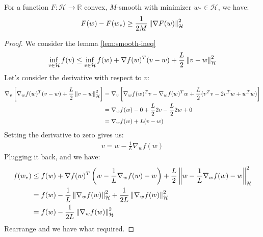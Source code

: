 \begin{lemma}
    For a function $F:\mathcal{H}\rightarrow \mathbb{R}$ convex, $M$-smooth with minimizer $w_*\in\mathcal{H}$, we have:
    \begin{equation*}
        F(w) - F(w_*) \ge \frac{1}{2M}\left\lVert\nabla F(w)\right\rVert^2_\mathcal{H}
    \end{equation*}
\end{lemma}
\begin{proof}
    We consider the lemma \ref{lem:smooth-ineq}
    \begin{equation*}
    \begin{aligned}
        \inf_{v\in\mathcal{H}} f(v) &\le \inf_{v\in\mathcal{H}} f(w) + \nabla f(w)^T(v-w) + \frac{L}{2}\left\lVert v-w\right\rVert^2_\mathcal{H}\\ 
    \end{aligned}
    \end{equation*}
    Let's consider the derivative with respect to $v$:
    \begin{equation*}
    \begin{aligned}
        \nabla_v \left[ \nabla_w f(w)^T(v-w) + \frac{L}{2}\left\lVert v-w\right\rVert^2_\mathcal{H}  \right] &= \nabla_v \left[ \nabla_w f(w)^Tv - \nabla_w f(w)^Tw + \frac{L}{2} (v^Tv - 2v^Tw + w^Tw)   \right] \\
        &= \nabla_w f(w) - 0 + \frac{L}{2}2v - \frac{L}{2}2w + 0 \\
        &= \nabla_w f(w) + L(v - w)
    \end{aligned}
    \end{equation*}
    Setting the derivative to zero gives us:
    \begin{equation*}
    \begin{aligned}
        v = w - \frac{1}{L} \nabla_w f(w)
    \end{aligned}
    \end{equation*}
    Plugging it back, and we have:
    \begin{equation*}
    \begin{aligned} 
        f(w_*) &\le f(w) + \nabla f(w)^T\left(  w - \frac{1}{L} \nabla_w f(w)-w \right) + \frac{L}{2}\left\lVert w - \frac{1}{L} \nabla_w f(w)-w\right\rVert^2_\mathcal{H}\\ 
        &= f(w) -\frac{1}{L}\left\lVert\nabla_w f(w)\right\rVert^2_\mathcal{H} + \frac{1}{2L}\left\lVert\nabla_w f(w)\right\rVert^2_\mathcal{H}\\
        &= f(w) - \frac{1}{2L}\left\lVert\nabla_w f(w)\right\rVert^2_\mathcal{H}\\
    \end{aligned}
    \end{equation*}
    Rearrange and we have what required.
\end{proof}

